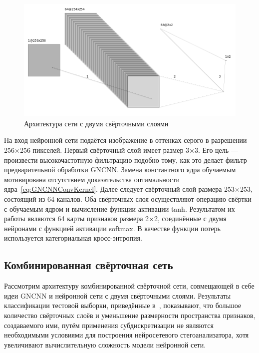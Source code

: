 \begin{figure}[!htb]
\centering
\includegraphics[width=1\textwidth]{include/graphics/french_gray_architecture}
\caption{Архитектура сети с двумя свёрточными слоями}
\label{fig:FrenchCNNArchitecture}
\end{figure}

На вход нейронной сети подаётся изображение в оттенках серого в разрешении 256×256 пикселей. Первый свёрточный слой имеет размер 3×3. Его цель --- произвести высокочастотную фильтрацию подобно тому, как это делает фильтр предварительной обработки GNCNN. Замена константного ядра обучаемым мотивирована отсутствием доказательства оптимальности ядра~\ref{eq:GNCNNConvKernel}. Далее следует свёрточный слой размера 253×253, состоящий из 64 каналов. Оба свёрточных слоя осуществляют операцию свёртки с обучаемым ядром и вычисление функции активации tanh. Результатом их работы являются 64 карты признаков размера 2×2, соединённые с двумя нейронами с функцией активации softmax. В качестве функции потерь используется категориальная кросс-энтропия.

\subsection{Комбинированная свёрточная сеть}

Рассмотрим архитектуру комбинированной свёрточной сети, совмещающей в себе идеи GNCNN и нейронной сети с двумя свёрточными слоями. Результаты классификации тестовой выборки, приведённые в~\cite{FrenchCNN}, показывают, что большое количество свёрточных слоёв и уменьшение размерности пространства признаков, создаваемого ими, путём применения субдискретизации не являются необходимыми условиями для построения нейросетевого стегоанализатора, хотя увеличивают вычислительную сложность модели нейронной сети.

